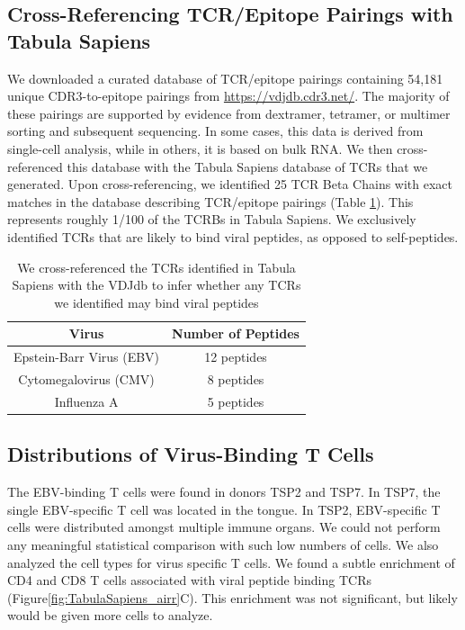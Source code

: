 \subsection{Cross-Referencing TCR/Epitope Pairings with Tabula Sapiens}

We downloaded a curated database of TCR/epitope pairings containing 54,181 unique CDR3-to-epitope pairings from \url{https://vdjdb.cdr3.net/}. The majority of these pairings are supported by evidence from dextramer, tetramer, or multimer sorting and subsequent sequencing. In some cases, this data is derived from single-cell analysis, while in others, it is based on bulk RNA. We then cross-referenced this database with the Tabula Sapiens database of TCRs that we generated. Upon cross-referencing, we identified 25 TCR Beta Chains with exact matches in the database describing TCR/epitope pairings (Table \ref{tab:TabulaSapiens_tab1_viral_peptides}). This represents roughly 1/100 of the TCRBs in Tabula Sapiens. We exclusively identified TCRs that are likely to bind viral peptides, as opposed to self-peptides.

\renewcommand{\arraystretch}{2}  %
\begin{table}[hbt!]
\centering
\begin{tabularx}{10cm}{cc}  %
   \textbf{Virus} & \textbf{Number of Peptides} \\
   \hline  %
Epstein-Barr Virus (EBV) & 12 peptides \\
\hline
 Cytomegalovirus (CMV) & 8 peptides \\
\hline
Influenza A & 5 peptides \\
\hline
\end{tabularx}
\caption[Table of TCR-Binding Inferences]{We cross-referenced the TCRs identified in Tabula Sapiens with the VDJdb to infer whether any TCRs we identified may bind viral peptides}
\label{tab:TabulaSapiens_tab1_viral_peptides}
\end{table}

\subsection{Distributions of Virus-Binding T Cells}
The EBV-binding T cells were found in donors TSP2 and TSP7. In TSP7, the single EBV-specific T cell was located in the tongue. In TSP2, EBV-specific T cells were distributed amongst multiple immune organs. We could not perform any meaningful statistical comparison with such low numbers of cells. We also analyzed the cell types for virus specific T cells. We found a subtle enrichment of CD4 and CD8 T cells associated with viral peptide binding TCRs (Figure\ref{fig:TabulaSapiens_airr}C). This enrichment was not significant, but likely would be given more cells to analyze.

